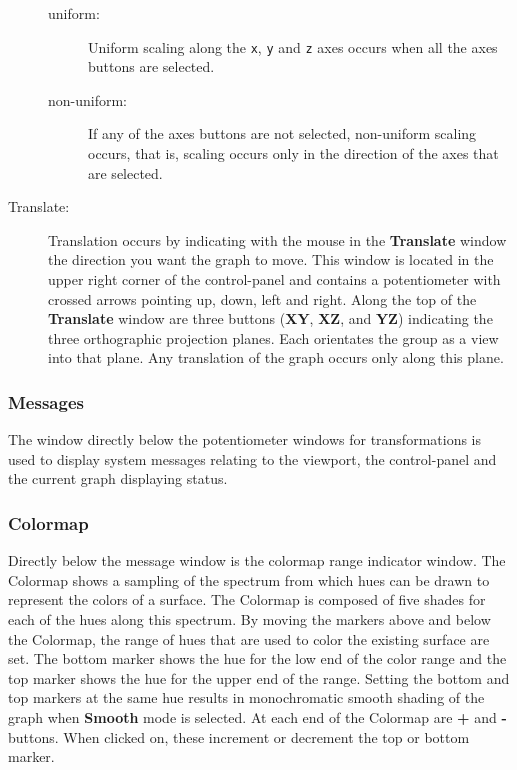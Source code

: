 \begin{description}
\begin{description}
%
\item[uniform:]  Uniform scaling along the {\tt x}, {\tt y}
and {\tt z} axes occurs when all the axes buttons are selected.
%
\item[non-uniform:]  If any of the axes buttons are
not selected, non-uniform scaling occurs, that is, scaling occurs only in the
direction of the axes that are selected.
\end{description}
%
\item[Translate:]  Translation occurs by indicating with the mouse in the
{\bf Translate} window the direction you want the graph to move.
This window is located in the upper right corner of the
control-panel and contains a potentiometer with crossed arrows
pointing up, down, left and right.
Along the top of the {\bf Translate} window are three buttons
({\bf XY},
{\bf XZ}, and {\bf YZ}) indicating the three orthographic projection planes.
Each orientates the group as a view into that plane.
Any translation of the graph occurs only along this plane.
\end{description}

\subsubsection{Messages}

The window directly below the potentiometer windows for transformations is
used to display system messages relating to the viewport, the control-panel
and the current graph displaying status.

\subsubsection{Colormap}

Directly below the message window is the colormap range indicator
window.
The \Language{} Colormap shows a sampling of the spectrum from
which hues can be drawn to represent the colors of a surface.
The Colormap is composed of five shades for each of the hues along
this spectrum.
By moving the markers above and below the Colormap, the range of
hues that are used to color the existing surface are set.
The bottom marker shows the hue for the low end of the color range
and the top marker shows the hue for the upper end of the range.
Setting the bottom and top markers at the same hue results in
monochromatic smooth shading of the graph when {\bf Smooth} mode is selected.
At each end of the Colormap are {\bf +} and {\bf -} buttons.
When clicked on, these increment or decrement the top or bottom
marker.

